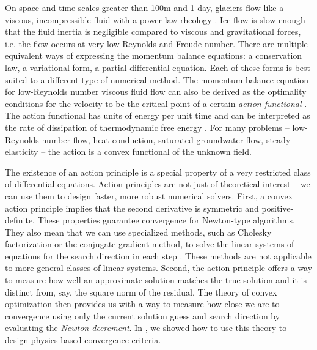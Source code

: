 \documentclass[review,oneside]{igs}
\begin{document}
On space and time scales greater than 100m and 1 day, glaciers flow like a viscous, incompressible fluid with a power-law rheology \citep{greve2009dynamics}.
Ice flow is slow enough that the fluid inertia is negligible compared to viscous and gravitational forces, i.e. the flow occurs at very low Reynolds and Froude number.
There are multiple equivalent ways of expressing the momentum balance equations: a conservation law, a variational form, a partial differential equation.
Each of these forms is best suited to a different type of numerical method.
The momentum balance equation for low-Reynolds number viscous fluid flow can also be derived as the optimality conditions for the velocity to be the critical point of a certain \emph{action functional} \citep{dukowicz2010consistent}.
The action functional has units of energy per unit time and can be interpreted as the rate of dissipation of thermodynamic free energy \citep{edelen1972nonlinear}.
For many problems -- low-Reynolds number flow, heat conduction, saturated groundwater flow, steady elasticity -- the action is a convex functional of the unknown field.

The existence of an action principle is a special property of a very restricted class of differential equations.
Action principles are not just of theoretical interest -- we can use them to design faster, more robust numerical solvers.
First, a convex action principle implies that the second derivative is symmetric and positive-definite.
These properties guarantee convergence for Newton-type algorithms.
They also mean that we can use specialized methods, such as Cholesky factorization or the conjugate gradient method, to solve the linear systems of equations for the search direction in each step \citep{nocedal2006numerical}.
These methods are not applicable to more general classes of linear systems.
Second, the action principle offers a way to measure how well an approximate solution matches the true solution and it is distinct from, say, the square norm of the residual.
The theory of convex optimization then provides us with a way to measure how close we are to convergence using only the current solution guess and search direction by evaluating the \emph{Newton decrement}.
In \citet{shapero2021icepack}, we showed how to use this theory to design physics-based convergence criteria.
\end{document}
